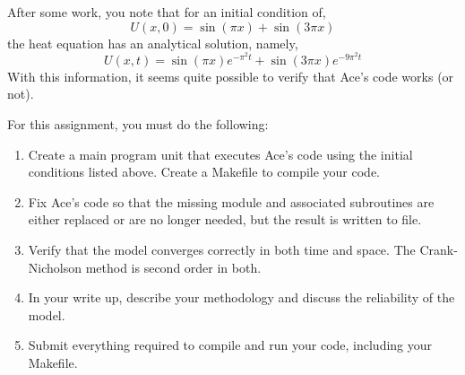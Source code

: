 \documentclass[12pt, letterpaper]{article}
\begin{document}
After some work, you note that for an initial condition of,
\begin{equation}
  U(x,0) = \sin(\pi x) + \sin(3 \pi x)
\end{equation}
the heat equation has an analytical solution, namely,
\begin{equation}
  U(x,t) = \sin(\pi x)e^{-\pi^2t}+\sin(3\pi x)e^{-9\pi^2t}
\end{equation}
With this information, it seems quite possible to verify that Ace's code works
(or not).

For this assignment, you must do the following:
\begin{enumerate}
  \item Create a main program unit that executes Ace's code using the
    initial conditions listed above.  Create a Makefile to compile your code.
  \item Fix Ace's code so that the missing module and associated subroutines
    are either replaced or are no longer needed, but the result is written 
    to file.
  \item Verify that the model converges correctly in both time and space.
    The Crank-Nicholson method is second order in both.
  \item In your write up, describe your methodology and discuss the 
    reliability of the model.
  \item Submit everything required to compile and run your code, including
    your Makefile.
\end{enumerate}



\end{document}
